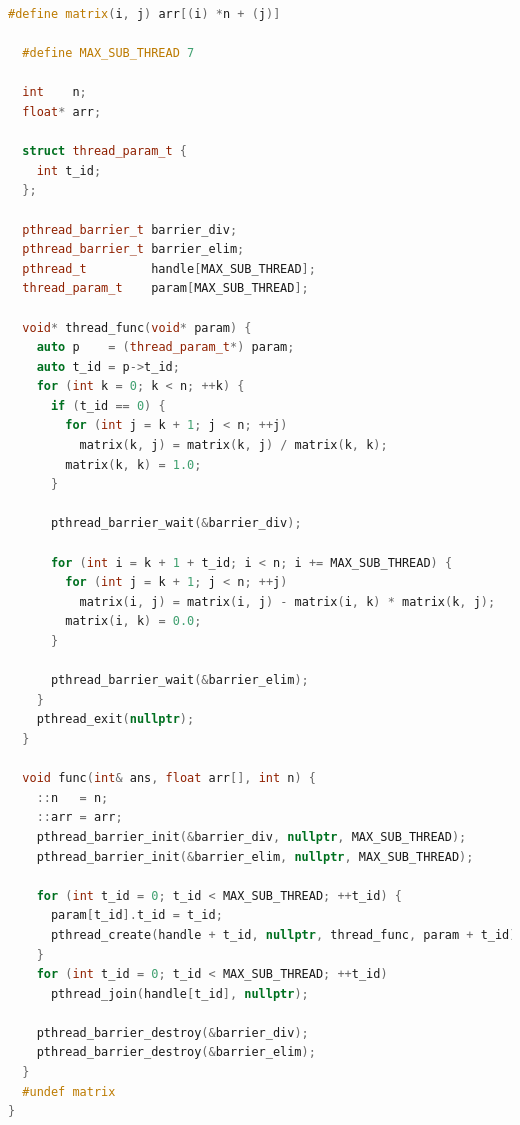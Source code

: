 \documentclass[a4paper]{article}
\begin{document}
\begin{lstlisting}[title=线程池+栅栏同步+工作线程执行除法,frame=trbl,language={C++}]
  #define matrix(i, j) arr[(i) *n + (j)]

  #define MAX_SUB_THREAD 7
  
  int    n;
  float* arr;
  
  struct thread_param_t {
    int t_id;
  };
  
  pthread_barrier_t barrier_div;
  pthread_barrier_t barrier_elim;
  pthread_t         handle[MAX_SUB_THREAD];
  thread_param_t    param[MAX_SUB_THREAD];
  
  void* thread_func(void* param) {
    auto p    = (thread_param_t*) param;
    auto t_id = p->t_id;
    for (int k = 0; k < n; ++k) {
      if (t_id == 0) {
        for (int j = k + 1; j < n; ++j)
          matrix(k, j) = matrix(k, j) / matrix(k, k);
        matrix(k, k) = 1.0;
      }
  
      pthread_barrier_wait(&barrier_div);
  
      for (int i = k + 1 + t_id; i < n; i += MAX_SUB_THREAD) {
        for (int j = k + 1; j < n; ++j)
          matrix(i, j) = matrix(i, j) - matrix(i, k) * matrix(k, j);
        matrix(i, k) = 0.0;
      }
  
      pthread_barrier_wait(&barrier_elim);
    }
    pthread_exit(nullptr);
  }
  
  void func(int& ans, float arr[], int n) {
    ::n   = n;
    ::arr = arr;
    pthread_barrier_init(&barrier_div, nullptr, MAX_SUB_THREAD);
    pthread_barrier_init(&barrier_elim, nullptr, MAX_SUB_THREAD);
  
    for (int t_id = 0; t_id < MAX_SUB_THREAD; ++t_id) {
      param[t_id].t_id = t_id;
      pthread_create(handle + t_id, nullptr, thread_func, param + t_id);
    }
    for (int t_id = 0; t_id < MAX_SUB_THREAD; ++t_id)
      pthread_join(handle[t_id], nullptr);
  
    pthread_barrier_destroy(&barrier_div);
    pthread_barrier_destroy(&barrier_elim);
  }
  #undef matrix
}
\end{lstlisting}
\end{document}
